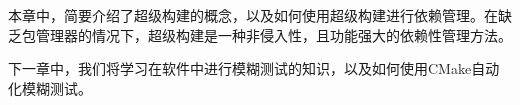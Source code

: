 本章中，简要介绍了超级构建的概念，以及如何使用超级构建进行依赖管理。在缺乏包管理器的情况下，超级构建是一种非侵入性，且功能强大的依赖性管理方法。

下一章中，我们将学习在软件中进行模糊测试的知识，以及如何使用CMake自动化模糊测试。